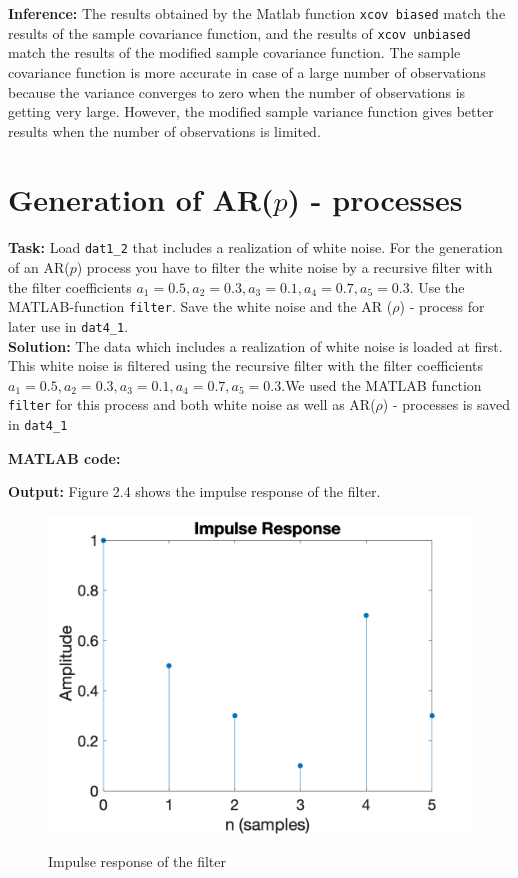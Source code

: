 \noindent \textbf{Inference:} The results obtained by the Matlab function \texttt{xcov biased} match the results of the sample covariance function, and the results of \texttt{xcov unbiased} match the results of the modified sample
covariance function. The sample covariance function is more accurate in case of a large number of observations because the variance converges to zero when the number of observations is getting very large. However, the modified sample variance function gives better results when the number of observations is limited.


\section{ Generation of AR($p$) - processes} 
\noindent \textbf{Task:} Load \texttt{dat1\_2} that includes a realization of white noise. For the generation of an AR($p$) process you have to filter the white noise by a recursive filter with the filter coefficients $a_1 = 0.5, a_2 = 0.3, a_3 = 0.1, a_4 = 0.7, a_5 = 0.3.$ Use the MATLAB-function \texttt{filter}. Save the white noise and the AR ($\rho$) - process for later use in \texttt{dat4\_1}.
 \\

\noindent \textbf{Solution:}
\noindent The data which includes a realization of white noise is loaded at first. This white noise is filtered using the recursive filter with the filter coefficients $a_1 = 0.5, a_2 = 0.3, a_3 = 0.1, a_4 = 0.7, a_5 = 0.3.$We used the MATLAB function \texttt{filter} for this process and both white noise as well as AR($\rho$) - processes is saved in \texttt{dat4\_1}

\noindent \textbf{MATLAB code:}


\noindent \textbf{Output:}
\noindent Figure 2.4 shows the impulse response of the filter.

\begin{figure}[H]
\centering
{\includegraphics[scale=0.25]{ass2_1.png}}
\caption{Impulse response of the filter }
\end{figure}

